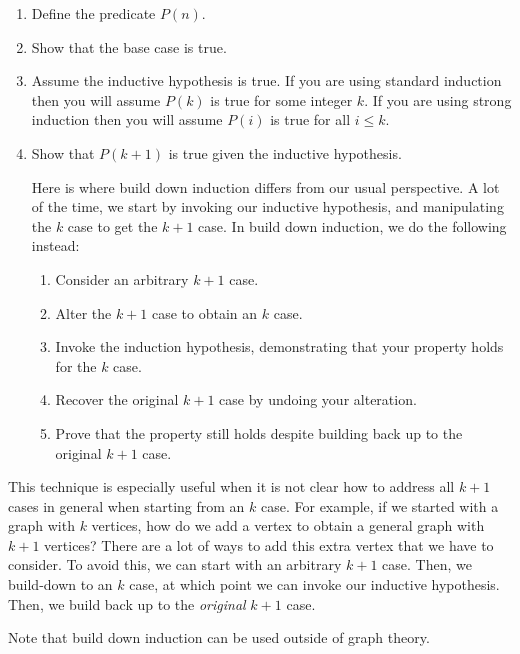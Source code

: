 \documentclass[12pt,letterpaper]{article}
\begin{document}
\begin{enumerate}
        \item Define the predicate $P(n)$.

        \item Show that the base case is true.

        \item Assume the inductive hypothesis is true. If you are using standard induction then you will assume 
			$P(k)$ is true for some integer $k$. If you are using strong induction then you will assume $P(i)$ is true for all $i \leq k$.

        \item Show that $P(k+1)$ is true given the inductive hypothesis.
        
            Here is where build down induction differs from our usual perspective. A lot of the time, we start by invoking our inductive hypothesis, and manipulating the $k$ case to get the $k+1$ case. In build down induction, we do the following instead:

            \begin{enumerate}
            \item Consider an arbitrary $k+1$ case.
            \item Alter the $k+1$ case to obtain an $k$ case.
            \item Invoke the induction hypothesis, demonstrating that your property holds for the $k$ case.
            \item Recover the original $k+1$ case by undoing your alteration.
            \item Prove that the property still holds despite building back up to the original $k+1$ case.
            \end{enumerate}
            \end{enumerate}

        This technique is especially useful when it is not clear how to address all $k+1$ cases in general when starting from an $k$ case. For example, if we started with a graph with $k$ vertices, how do we add a vertex to obtain a general graph with $k+1$ vertices? There are a lot of ways to add this extra vertex that we have to consider. To avoid this, we can start with an arbitrary $k+1$ case. Then, we build-down to an $k$ case, at which point we can invoke our inductive hypothesis. Then, we build back up to the \emph{original} $k+1$ case.

Note that build down induction can be used outside of graph theory.
\end{document}
